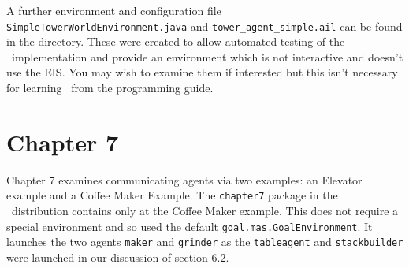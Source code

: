 \begin{sloppypar}
  A further environment and configuration file \texttt{SimpleTowerWorldEnvironment.java} and \texttt{tower\_agent\_simple.ail} can be found in the directory.  These were created to allow automated testing of the \goal\ implementation and provide an environment which is not interactive and doesn't use the EIS.  You may wish to examine them if interested but this isn't necessary for learning \goal\ from the programming guide.
  \end{sloppypar}

\section{Chapter 7}

Chapter 7 examines communicating agents via two examples: an Elevator example and a Coffee Maker Example.  The \texttt{chapter7} package in the \ail\ distribution contains only at the Coffee Maker example.  This does not require a special environment and so used the default \texttt{goal.mas.GoalEnvironment}.  It launches the two agents \texttt{maker} and \texttt{grinder} as the \texttt{tableagent} and \texttt{stackbuilder} were launched in our discussion of section 6.2.

